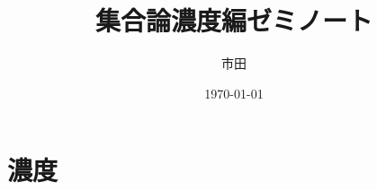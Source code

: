 \documentclass[a4j,dvipdfmx,10pt]{ujreport}
\title{集合論濃度編ゼミノート}
\author{市田}
\date{\today}
\begin{document}
\maketitle

\setcounter{chapter}{6}
\chapter{濃度}
\label{chapter:濃度}



\end{document}
